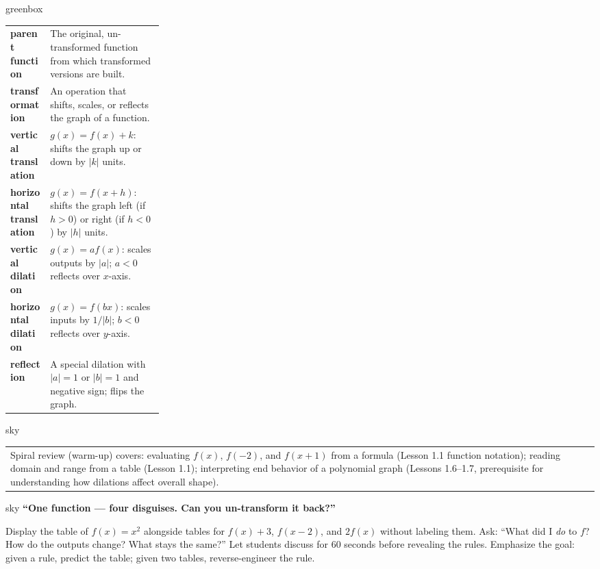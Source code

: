 \documentclass[10pt]{article}
\begin{document}
\begin{skillbox}{greenbox}
\renewcommand{\arraystretch}{1.4}
\begin{tabularx}{\linewidth}{@{} >{\bfseries\color{navy}}p{0.26\linewidth} X @{}}
parent function         & The original, un-transformed function from which transformed versions are built. \\
transformation          & An operation that shifts, scales, or reflects the graph of a function. \\
vertical translation    & $g(x)=f(x)+k$: shifts the graph up or down by $|k|$ units. \\
horizontal translation  & $g(x)=f(x+h)$: shifts the graph left (if $h>0$) or right (if $h<0$) by $|h|$ units. \\
vertical dilation       & $g(x)=af(x)$: scales outputs by $|a|$; $a<0$ reflects over $x$-axis. \\
horizontal dilation     & $g(x)=f(bx)$: scales inputs by $1/|b|$; $b<0$ reflects over $y$-axis. \\
reflection              & A special dilation with $|a|=1$ or $|b|=1$ and negative sign; flips the graph. \\
\end{tabularx}
\end{skillbox}

\begin{skillbox}{sky}
    \begin{tabularx}{\linewidth}{@{}X@{}}
        Spiral review (warm-up) covers: evaluating $f(x)$, $f(-2)$, and $f(x+1)$ from a formula
        (Lesson 1.1 function notation); reading domain and range from a table (Lesson 1.1);
        interpreting end behavior of a polynomial graph (Lessons 1.6--1.7, prerequisite for
        understanding how dilations affect overall shape).
    \end{tabularx}
\end{skillbox}

\begin{skillbox}[Hook]{sky}
\textbf{``One function --- four disguises. Can you un-transform it back?''}

Display the table of $f(x)=x^2$ alongside tables for $f(x)+3$, $f(x-2)$, and $2f(x)$ without
labeling them. Ask: ``What did I \textit{do} to $f$? How do the outputs change? What stays the
same?'' Let students discuss for 60 seconds before revealing the rules. Emphasize the goal: given
a rule, predict the table; given two tables, reverse-engineer the rule.
\end{skillbox}
\end{document}
